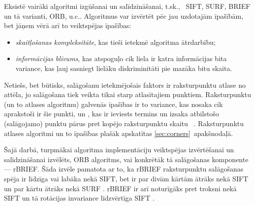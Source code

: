 Eksistē vairāki algoritmi  izgūšanai un
salīdzināšanai, t.sk.,~%
SIFT, %
SURF, BRIEF un tā varianti, ORB, u.c..
Algoritmus var izvērtēt pēc jau uzdotajām īpašībām, 
bet jāņem vērā arī to veiktspējas īpašības:
\begin{itemize}
	\item \emph{skaitļošanas kompleksitāte}, kas tieši ietekmē algoritma
		ātrdarbību;
	\item \emph{informācijas blīvums}, kas atspoguļo cik liela ir katra
		informācijas bita variance, kas ļauj sasniegt lielāku diskriminitāti
		pie mazāka bitu skaita.
\end{itemize}

Netiešs, bet būtisks, salāgošanu ietekmējošais faktors ir raksturpunktu
atlase no attēla, jo salāgošana tiek veikta tikai starp atlasītajiem
punktiem. Raksturpunktu (un to atlases algoritmu) galvenās īpašības
ir to variance, kas nosaka cik aprakstoši ir šie punkti,
un , kas ir ieviests termins un izsaka
atbilstošo (salāgojamo) punktu pārus pret kopējo raksturpunktu skaitu~%
\cite{FAST}\cite{SIFT-FPGA}.
Raksturpunktu atlases algoritmi un to īpašības plašāk apskatītas
\ref{sec:corners}~apakšnodaļā.

Šajā darbā, turpmākai algoritma implementāciju veiktspējas izvērtēšanai
un salīdzināšanai izvēlēts, ORB algoritms, vai konkrētāk tā salāgošanas
komponente --- rBRIEF.
Šāda izvēle pamatota ar to, ka rBRIEF raksturpunktu salāgošanas
spēja ir līdzīga vai labāka nekā SIFT, bet ir par divām kārtām ātrāks nekā
SIFT un par kārtu ātrāks nekā SURF \cite{ORB}.
rBRIEF  ir arī noturīgāks pret troksni nekā
SIFT un tā rotācijas invariance līdzvērtīga SIFT \cite{ORB}.


